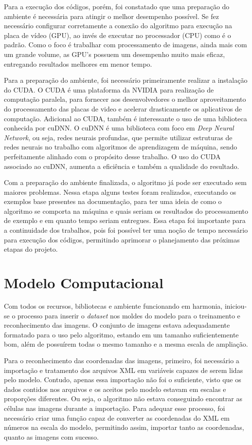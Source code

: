 Para a execução dos códigos, porém, foi constatado que uma preparação do ambiente é necessária para atingir o melhor desempenho possível. Se fez necessário configurar corretamente a conexão do algoritmo para execução na placa de vídeo (GPU), ao invés de executar no processador (CPU) como é o padrão. Como o foco é trabalhar com processamento de imagens, ainda mais com um grande volume, as GPU's possuem um desempenho muito mais eficaz, entregando resultados melhores em menor tempo.

Para a preparação do ambiente, foi necessário primeiramente realizar a instalação do CUDA. O CUDA é uma plataforma da NVIDIA para realização de computação paralela, para fornecer aos desenvolvedores o melhor aproveitamento do processamento das placas de video e acelerar drasticamente os aplicativos de computação. Adicional ao CUDA, também é interessante o uso de uma biblioteca conhecida por cuDNN. O cuDNN é uma biblioteca com foco em \emph{Deep Neural Network}, ou seja, redes neurais profundas, que permite utilizar estruturas de redes neurais no trabalho com algoritmos de aprendizagem de máquina, sendo perfeitamente alinhado com o propósito desse trabalho. O uso do CUDA associado ao cuDNN, aumenta a eficiência e também a qualidade do resultado. \cite{websiteCUDA, websiteCUDNN}

Com a preparação do ambiente finalizada, o algoritmo já pode ser executado sem maiores problemas. Nessa etapa alguns testes foram realizados, executando os exemplos base presentes na documentação, para ter uma ideia de como o algoritmo se comporta na máquina e quais seriam os resultados do processamento de exemplo e em quanto tempo seriam entregues. Essa etapa foi importante para a continuidade dos trabalhos, pois foi possível ter uma noção de tempo necessário para execução dos códigos, permitindo aprimorar o planejamento das próximas etapas do projeto.

\section{Modelo Computacional}
Com todos os recursos, bibliotecas e ambiente funcionando em harmonia, iniciou-se o processo para inserir o \emph{dataset} nos moldes do modelo para o treinamento e reconhecimento das imagens. O conjunto de imagens estava adequadamente formatado para o uso pelo algoritmo, estando em um tamanho suficientemente bom, além de possuírem todas o mesmo tamanho e a mesma escala de ampliação.

Para o reconhecimento das coordenadas das imagens, primeiro, foi necessário a importação e tratamento dos arquivos XML em variáveis capazes de serem lidas pelo modelo. Contudo, apenas essa importação não foi o suficiente, visto que os dados contidos nos arquivos e os aceitos pelo modelo estavam em escalas e proporções diferentes. Ou seja, o algoritmo não estava conseguindo encontrar as células nas imagens durante a importação. Para adequar esse processo, foi necessário criar uma função capaz de converter as coordenadas do XML em números na escala do modelo, permitindo assim, importar tanto as coordenadas, quanto as imagens com sucesso.

